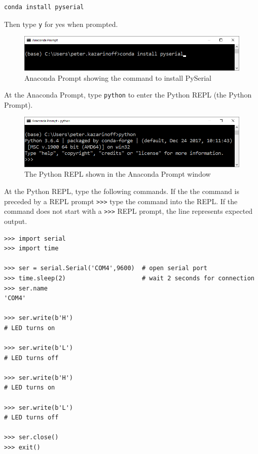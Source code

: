\documentclass[11pt]{article}
\begin{document}
\begin{verbatim}
conda install pyserial
\end{verbatim}

Then type \texttt{y} for yes when prompted.

\begin{figure}
\centering
\includegraphics{images/anaconda_prompt_install_pyserial.png}
\caption{Anaconda Prompt showing the command to install PySerial}
\end{figure}

At the Anaconda Prompt, type \texttt{python} to enter the Python REPL
(the Python Prompt).

\begin{figure}
\centering
\includegraphics{images/anaconda_prompt_python_REPL.png}
\caption{The Python REPL shown in the Anaconda Prompt window}
\end{figure}

At the Python REPL, type the following commands. If the the command is
preceded by a REPL prompt
\texttt{\textgreater{}\textgreater{}\textgreater{}} type the command
into the REPL. If the command does not start with a
\texttt{\textgreater{}\textgreater{}\textgreater{}} REPL prompt, the
line represents expected output.

\begin{verbatim}
>>> import serial
>>> import time

>>> ser = serial.Serial('COM4',9600)  # open serial port
>>> time.sleep(2)                     # wait 2 seconds for connection
>>> ser.name
'COM4'

>>> ser.write(b'H')
# LED turns on

>>> ser.write(b'L')
# LED turns off

>>> ser.write(b'H')
# LED turns on

>>> ser.write(b'L')
# LED turns off

>>> ser.close()
>>> exit()
\end{verbatim}
\end{document}
